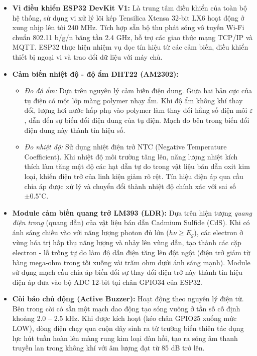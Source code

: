 \begin{itemize}[leftmargin=0.8cm]
    \item \textbf{Vi điều khiển ESP32 DevKit V1:} Là trung tâm điều khiển của toàn bộ hệ thống, sử dụng vi xử lý lõi kép Tensilica Xtensa 32-bit LX6 hoạt động ở xung nhịp lên tới 240 MHz. Tích hợp sẵn bộ thu phát sóng vô tuyến Wi-Fi chuẩn 802.11 b/g/n băng tần 2.4 GHz, hỗ trợ các giao thức mạng TCP/IP và MQTT. ESP32 thực hiện nhiệm vụ đọc tín hiệu từ các cảm biến, điều khiển thiết bị ngoại vi và trao đổi dữ liệu với máy chủ.
    
    \item \textbf{Cảm biến nhiệt độ - độ ẩm DHT22 (AM2302):}
    \begin{itemize}
        \item \textit{Đo độ ẩm:} Dựa trên nguyên lý cảm biến điện dung. Giữa hai bản cực của tụ điện có một lớp màng polymer nhạy ẩm. Khi độ ẩm không khí thay đổi, lượng hơi nước hấp phụ vào polymer làm thay đổi hằng số điện môi $\varepsilon$, dẫn đến sự biến đổi điện dung của tụ điện. Mạch đo bên trong biến đổi điện dung này thành tín hiệu số.
        \item \textit{Đo nhiệt độ:} Sử dụng nhiệt điện trở NTC (Negative Temperature Coefficient). Khi nhiệt độ môi trường tăng lên, năng lượng nhiệt kích thích làm tăng mật độ các hạt dẫn tự do trong vật liệu bán dẫn oxit kim loại, khiến điện trở của linh kiện giảm rõ rệt. Tín hiệu điện áp qua cầu chia áp được xử lý và chuyển đổi thành nhiệt độ chính xác với sai số $\pm 0.5^\circ$C.
    \end{itemize}

    \item \textbf{Module cảm biến quang trở LM393 (LDR):} Dựa trên hiện tượng \textit{quang điện trong} (quang dẫn) của vật liệu bán dẫn Cadmium Sulfide (CdS). Khi có ánh sáng chiếu vào với năng lượng photon đủ lớn ($h\nu \ge E_g$), các electron ở vùng hóa trị hấp thụ năng lượng và nhảy lên vùng dẫn, tạo thành các cặp electron - lỗ trống tự do làm độ dẫn điện tăng lên đột ngột (điện trở giảm từ hàng mega-ohm trong tối xuống vài trăm ohm dưới ánh sáng mạnh). Module sử dụng mạch cầu chia áp biến đổi sự thay đổi điện trở này thành tín hiệu điện áp đưa vào bộ ADC 12-bit tại chân GPIO34 của ESP32.

    \item \textbf{Còi báo chủ động (Active Buzzer):} Hoạt động theo nguyên lý điện từ. Bên trong còi có sẵn một mạch dao động tạo sóng vuông ở tần số cố định khoảng 2.0 – 2.5 kHz. Khi được kích hoạt (kéo chân GPIO25 xuống mức LOW), dòng điện chạy qua cuộn dây sinh ra từ trường biến thiên tác dụng lực hút tuần hoàn lên màng rung kim loại đàn hồi, tạo ra sóng âm thanh truyền lan trong không khí với âm lượng đạt từ 85 dB trở lên.


\end{itemize}
